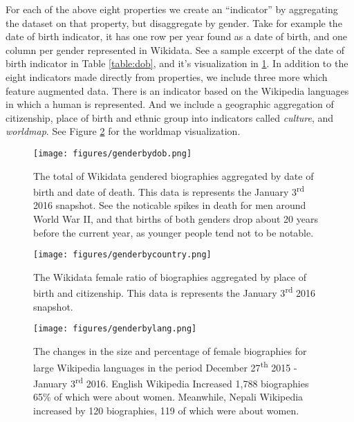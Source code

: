 \documentclass{sig-alternate-05-2015}
\begin{document}
For each of the above eight properties we create an ``indicator'' by aggregating the dataset on that property, but disaggregate by gender. Take for example the date of birth indicator, it has one row per year found as a date of birth, and one column per gender represented in Wikidata. See a sample excerpt of the date of birth indicator in Table \ref{table:dob}, and it's visualization in \ref{fig:genderbydob}. In addition to the eight indicators made directly from properties, we include three more which feature augmented data. There is an indicator based on the Wikipedia languages in which a human is represented. And we include a geographic aggregation of citizenship, place of birth and ethnic group into indicators called \textit{culture}, and \textit{worldmap}. See Figure \ref{fig:genderbycountry} for the worldmap visualization.


\begin{figure}
\texttt{[image: figures/genderbydob.png]}

\caption{The total of Wikidata gendered biographies aggregated by date of birth and date of death. This data is represents the January 3\textsuperscript{rd} 2016 snapshot. See the noticable spikes in death for men around World War II, and that births of both genders drop about 20 years before the current year, as younger people tend not to be notable.}

\label{fig:genderbydob}
\end{figure}

\begin{figure}
\texttt{[image: figures/genderbycountry.png]}
\caption{The Wikidata female ratio of biographies aggregated by place of birth and citizenship. This data is represents the January 3\textsuperscript{rd} 2016 snapshot.}
\label{fig:genderbycountry}
\end{figure}

\begin{figure}
\texttt{[image: figures/genderbylang.png]}

\caption{The changes in the size and percentage of female biographies for large
    Wikipedia languages in the period December 27\textsuperscript{th} 2015 -
    January 3\textsuperscript{rd} 2016. English Wikipedia Increased 1,788
    biographies 65\% of which were about women. Meanwhile, Nepali Wikipedia
increased by 120 biographies, 119 of which were about women.}

\label{fig:genderbylang}
\end{figure}
\end{document}
